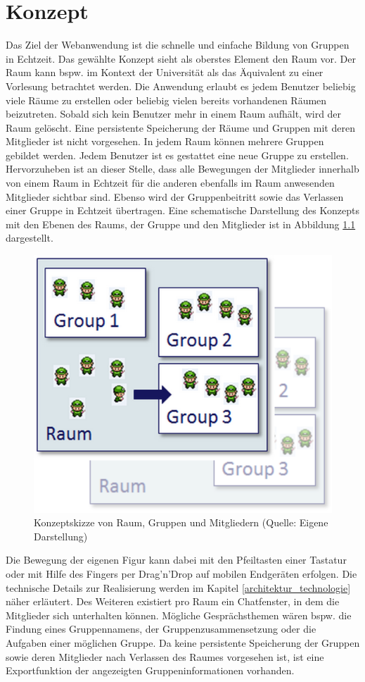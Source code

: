 \chapter{Konzept}
\label{konzept}

Das Ziel der Webanwendung ist die schnelle und einfache Bildung von Gruppen in Echtzeit. Das gewählte Konzept sieht als oberstes Element den Raum vor. Der Raum kann bspw. im Kontext der Universität als das Äquivalent zu einer Vorlesung betrachtet werden. Die Anwendung erlaubt es jedem Benutzer beliebig viele Räume zu erstellen oder beliebig vielen bereits vorhandenen Räumen beizutreten. Sobald sich kein Benutzer mehr in einem Raum aufhält, wird der Raum gelöscht. Eine persistente Speicherung der Räume und Gruppen mit deren Mitglieder ist nicht vorgesehen.
\newline\newline
In jedem Raum können mehrere Gruppen gebildet werden. Jedem Benutzer ist es gestattet eine neue Gruppe zu erstellen. Hervorzuheben ist an dieser Stelle, dass alle Bewegungen der Mitglieder innerhalb von einem Raum in Echtzeit für die anderen ebenfalls im Raum anwesenden Mitglieder sichtbar sind. Ebenso wird der Gruppenbeitritt sowie das Verlassen einer Gruppe in Echtzeit übertragen. Eine schematische Darstellung des Konzepts mit den Ebenen des Raums, der Gruppe und den Mitglieder ist in Abbildung \ref{konzeptskizze} dargestellt.

\begin{figure}[h]
\centering
\includegraphics[width=0.35\linewidth]{graphiken/konzeptskizze.png}%
\caption{Konzeptskizze von Raum, Gruppen und Mitgliedern (Quelle: Eigene Darstellung)}%
\label{konzeptskizze}%
\end{figure}

Die Bewegung der eigenen Figur kann dabei mit den Pfeiltasten einer Tastatur oder mit Hilfe des Fingers per Drag'n'Drop auf mobilen Endgeräten erfolgen. Die technische Details zur Realisierung werden im Kapitel \ref{architektur_technologie} näher erläutert. Des Weiteren existiert pro Raum ein Chatfenster, in dem die Mitglieder sich unterhalten können. Mögliche Gesprächsthemen wären bspw. die Findung eines Gruppennamens, der Gruppenzusammensetzung oder die Aufgaben einer möglichen Gruppe. Da keine persistente Speicherung der Gruppen sowie deren Mitglieder nach Verlassen des Raumes vorgesehen ist, ist eine Exportfunktion der angezeigten Gruppeninformationen vorhanden.
